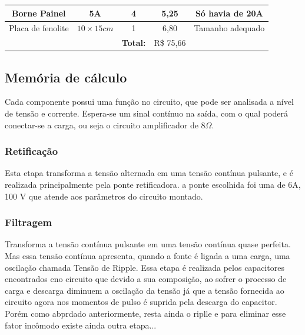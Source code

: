 \documentclass[a4paper,12pt,oneside,openany,table,xcdraw]{article}
\begin{document}
\begin{table}[H]
{\begin{tabular}{cc|c|c|c}
\multicolumn{1}{|c|}{Borne Painel}                  & 5A                     & 4                   & 	5,25	  & \multicolumn{1}{c|}{Só havia de 20A}       \\ \hline
\multicolumn{1}{|c|}{Placa de fenolite}             & $10\times 15cm$        & 1                   & 6,80                         & \multicolumn{1}{c|}{Tamanho adequado}      \\ \hline
                                                    &                        & \textbf{Total:}     & R\$ 75,66                    &                                            \\ \cline{3-4}
\end{tabular}%
}
\end{table}

\vspace{0.2cm}
\subsection{Memória de cálculo} %
Cada componente possui uma função no circuito, que pode ser analisada a nível de tensão e corrente. Espera-se um sinal contínuo na saída, com o qual poderá conectar-se a carga, ou seja o circuito amplificador de $8 \Omega$.

\subsubsection{Retificação}
Esta etapa transforma a tensão alternada em uma tensão contínua pulsante, e é realizada principalmente pela ponte retificadora. a ponte escolhida foi uma de 6A, 100 V que atende aos parâmetros do circuito montado.


\subsubsection{Filtragem}
Transforma a tensão contínua pulsante em uma tensão contínua quase perfeita. Mas essa tensão contínua apresenta, quando a fonte é ligada a uma carga, uma oscilação chamada Tensão de Ripple. Essa etapa é realizada pelos capacitores encontrados eno circuito que devido a sua composição, ao sofrer o processo de carga e descarga diminuem a oscilação da tensão já que a tensão fornecida ao circuito agora nos momentos de pulso é suprida pela descarga do capacitor. Porém como abprdado anteriormente, resta ainda o riplle e para eliminar esse fator incômodo existe ainda outra etapa...
\end{document}
